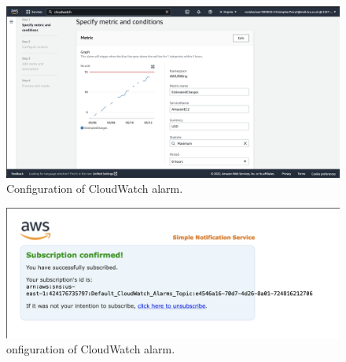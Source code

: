 \begin{figure}[!htbp]
    \centering
    \includegraphics[width=\textwidth]{resources/cloudwatch/cloudwatch-charges-config-1}
    \caption{Configuration of CloudWatch alarm.}
    \label{fig:cloudwatch-charges-config-1}
\end{figure}

\begin{figure}[!htbp]
    \centering
    \includegraphics[width=\textwidth]{resources/cloudwatch/cloudwatch-alarm-success}
    \caption{onfiguration of CloudWatch alarm.}
    \label{fig:cloudwatch-charges-config-2}
\end{figure}









